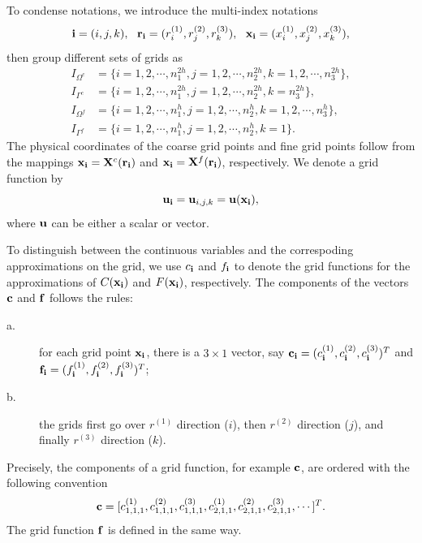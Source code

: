  To condense notations, we introduce the multi-index notations
\[{\bf i} = (i,j,k),\ \ {\bf r}_{\bf i} = (r^{(1)}_i,r^{(2)}_j,r^{(3)}_k),\ \ {\bf x}_{\bf i} = (x^{(1)}_i,x^{(2)}_j,x^{(3)}_k),\]
then group different sets of grids as
\begin{equation*}
\begin{aligned}
	I_{\Omega^c} &= \{i = 1,2,\cdots,n_1^{2h}, j = 1,2,\cdots,n_2^{2h}, k = 1,2,\cdots,n_3^{2h}\},\\
	I_{\Gamma^c} & = \{i = 1,2,\cdots,n_1^{2h}, j = 1,2,\cdots,n_2^{2h}, k = n_3^{2h}\},\\
	I_{\Omega^f} &= \{i = 1,2,\cdots,n_1^h, j = 1,2,\cdots,n_2^h, k = 1,2,\cdots,n_3^h\},\\
	I_{\Gamma^f} & = \{i = 1,2,\cdots,n_1^{h}, j = 1,2,\cdots,n_2^{h}, k = 1\}.
\end{aligned}	
\end{equation*}
The physical coordinates of the coarse grid points and fine grid points follow from the mappings ${\bf x}_{\bf i} = {\bf X}^c({\bf r}_{\bf i})$ and ${\bf x}_{\bf i} = {\bf X}^f({\bf r}_{\bf i})$, respectively. We denote a grid function by
\[{\bf u}_{\bf i} = {\bf u}_{i,j,k} = {\bf u}({\bf x}_{\bf i}),\]
where ${\bf u}$ can be either a scalar or vector. {\color{red} To distinguish between the continuous variables and the correspoding approximations on the grid, we use $c_{\bf i}$ and $f_{\bf i}$ to denote the grid functions for the approximations of $C({\bf x}_{\bf i})$ and $F({\bf x}_{\bf i})$, respectively. The components of the vectors $\bf c$ and $\bf f$ follows the rules:
	\begin{description}
		\item[a.] for each grid point ${\bf x}_{\bf i}$, there is a $3\times 1$ vector, say ${\bf c}_{\bf i} = (c^{(1)}_{\bf i}, c^{(2)}_{\bf i}, c^{(3)}_{\bf i})^T$ and ${\bf f}_{\bf i} = (f^{(1)}_{\bf i}, f^{(2)}_{\bf i}, f^{(3)}_{\bf i})^T$;
		\item[b.] the grids first go over $r^{(1)}$ direction ($i$), then $r^{(2)}$ direction ($j$), and finally $r^{(3)}$ direction ($k$).
	\end{description}
}
Precisely, the components of a grid function, for example $\bf c$, are ordered with the following convention
\[
{\bf c} = [c^{(1)}_{1,1,1}, c^{(2)}_{1,1,1}, c^{(3)}_{1,1,1},c^{(1)}_{2,1,1}, c^{(2)}_{2,1,1}, c^{(3)}_{2,1,1},\cdots]^T.
\]
The grid function $\bf f$ is defined in the same way. 
	
	

